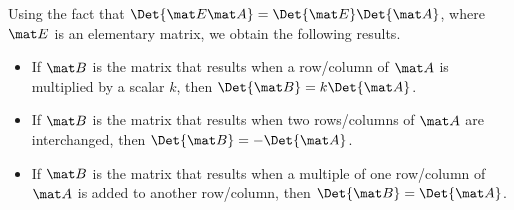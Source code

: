 Using the fact that $\Det{\mat E \mat A} = \Det{\mat E}\Det{\mat A}$, where $\mat E$ is an elementary matrix, we obtain the following results.

\begin{fact}
    \phantom{.}
    \begin{itemize}
        \item If $\mat B$ is the matrix that results when a row/column of $\mat A$ is multiplied by a scalar $k$, then $\Det{\mat B} = k \Det{\mat A}$.
        \item If $\mat B$ is the matrix that results when two rows/columns of $\mat A$ are interchanged, then $\Det{\mat B} = -\Det{\mat A}$.
        \item If $\mat B$ is the matrix that results when a multiple of one row/column of $\mat A$ is added to another row/column, then $\Det{\mat B} = \Det{\mat A}$.
    \end{itemize}
\end{fact}